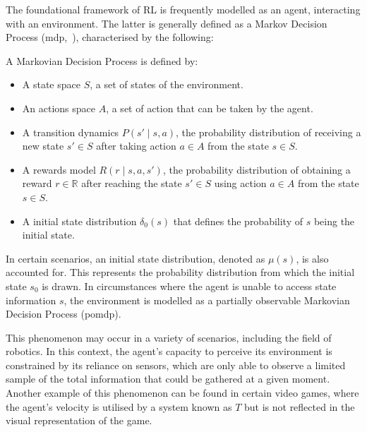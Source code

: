 The foundational framework of RL is frequently modelled as an agent, interacting with an environment.
The latter is generally defined as a Markov Decision Process (\acrshort{mdp},~\citep{bellman1957markovian}),
characterised by the following:
\begin{definition}[MDP]\label{definition:bg:rl:mdp} A Markovian Decision Process is defined by:
\begin{itemize}
    \item A state space $S$, a set of states of the environment.
    \item An actions space $A$, a set of action that can be taken by the agent.
    \item A transition dynamics $P(s' \mid s,a)$, the probability distribution of receiving a new state $s' \in S$ after
taking action $a \in A$ from the state $s \in S$. %
    \item A rewards model $R(r \mid s, a, s')$, the probability distribution of obtaining a reward $r\in \mathbb{R}$ after
reaching the state $s' \in S$ using action $a \in A$ from the state $s \in S$.
    \item A initial state distribution $\delta_0(s)$ that defines the probability of $s$ being the initial state.
\end{itemize}
\end{definition}
In certain scenarios, an initial state distribution, denoted as $\mu(s)$, is also accounted for.
This represents the probability distribution from which the initial state $s_0$ is drawn.
In circumstances where the agent is unable to access state information $s$, the environment is modelled as a partially
observable Markovian Decision Process (\acrshort{pomdp}).

This phenomenon may occur in a variety of scenarios, including the field of robotics.
In this context, the agent's capacity to perceive its environment is constrained by its reliance on sensors, which are
only able to observe a limited sample of the total information that could be gathered at a given moment.
Another example of this phenomenon can be found in certain video games, where the agent's velocity is utilised by a
system known as $T$ but is not reflected in the visual representation of the game.

